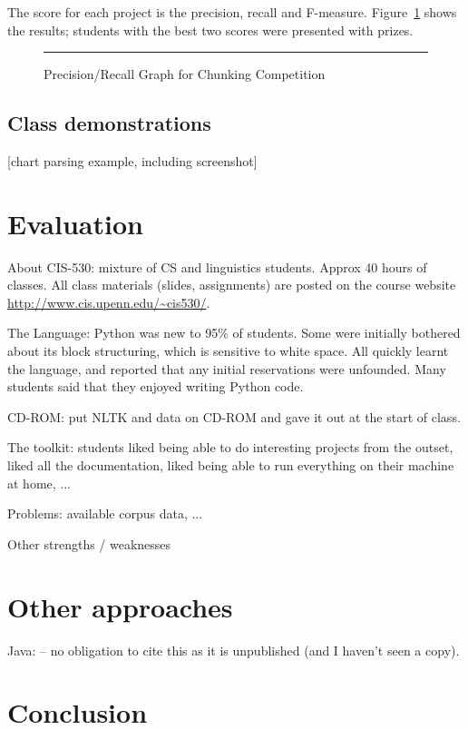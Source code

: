 \documentclass[11pt]{article}
\begin{document}
The score for each project is the precision, recall and F-measure.
Figure~\ref{contest} shows the results; students with the best two scores
were presented with prizes.

\begin{figure}
\centerline{}
\caption{Precision/Recall Graph for Chunking Competition}\label{contest}
\vspace*{2ex}\hrule
\end{figure}

\subsection{Class demonstrations}

[chart parsing example, including screenshot]

\section{Evaluation}

About CIS-530: mixture of CS and linguistics students.
Approx 40 hours of classes.  All class materials (slides,
assignments) are posted on the course website
\url{http://www.cis.upenn.edu/~cis530/}.

The Language: Python was new to 95\% of students.  Some were initially
bothered about its block structuring, which is sensitive to white
space.  All quickly learnt the language, and reported that any initial
reservations were unfounded.  Many students said that they enjoyed
writing Python code.

CD-ROM: put NLTK and data on CD-ROM and gave it out at the start of class.

The toolkit: students liked being able to do interesting projects from
the outset, liked all the documentation, liked being able to run
everything on their machine at home, ...

Problems: available corpus data, ...

Other strengths / weaknesses

\section{Other approaches}

Java: \cite{Hammond02}
-- no obligation to cite this as it is unpublished
(and I haven't seen a copy).

\section{Conclusion}
\end{document}
